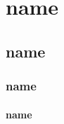 \documentclass[12pt]{article}
\newcommand\"{quote}
\begin{document}


\\

\\[1.5ex]


\part{name}
\chapter{name}
\section[title]{name}
\subsection{name}
\end{document}
